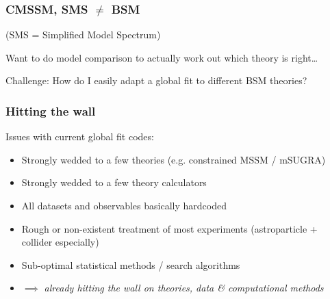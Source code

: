 \documentclass[xcolor=dvipsnames]{beamer}
\begin{document}
\begin{frame}
\frametitle{CMSSM, SMS $\ne$ BSM}

(SMS = Simplified Model Spectrum)
\vspace{3mm}

Want to do model comparison to actually work out which theory is right\ldots
\vspace{3mm}

\begin{exampleblock}{Challenge:}
How do I easily adapt a global fit to different BSM theories?
\end{exampleblock}


\end{frame}

\begin{frame}
\frametitle{Hitting the wall}

Issues with current global fit codes:
\begin{itemize}
\item Strongly wedded to a few theories (e.g. constrained MSSM / mSUGRA)
\item Strongly wedded to a few theory calculators
\item All datasets and observables basically hardcoded
\item Rough or non-existent treatment of most experiments (astroparticle + collider especially)
\item Sub-optimal statistical methods / search algorithms
\item $\implies$ \textit{already hitting the wall on theories, data \& computational methods}
\end{itemize}

\end{frame}
\end{document}
